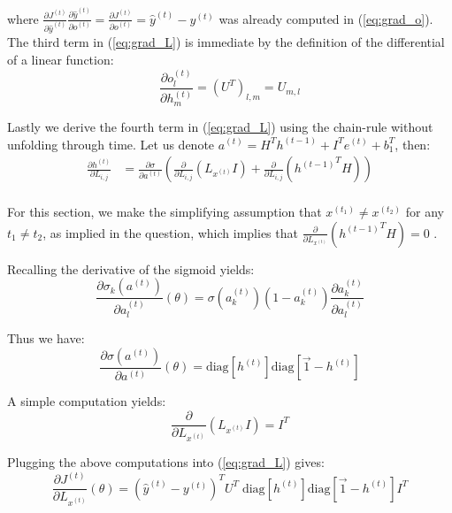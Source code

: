 where $\frac{\partial J^{(t)}}{\partial \hat{y}^{(t)}} \frac{{\partial \hat{y}^{(t)}}}{\partial o^{(t)}} = \frac{\partial J^{(t)}}{\partial o^{(t)}} = \hat{y}^{(t)} - y^{(t)}$ was already computed in (\ref{eq:grad_o}). 
The third term in (\ref{eq:grad_L}) is immediate by the definition of the differential of a linear function:
\begin{equation} \label{eq:grad_o_by_h}
  \frac{\partial o_l^{(t)}}{\partial h_m^{(t)}} = (U^T)_{l,m} = U_{m,l}
\end{equation}

Lastly we derive the fourth term in (\ref{eq:grad_L}) using the chain-rule without unfolding through time.
Let us denote $a^{(t)} = H^T h^{(t-1)} +I^T e^{(t)} + b_1^T$, then:
\begin{equation} \label{eq:grad_h_by_L}
  \begin{aligned}
    \frac{\partial h^{(t)}}{\partial L_{i,j}} &= \frac{\partial \sigma}{\partial a^{(t)}} \left( \frac{\partial}{\partial L_{i,j}} { \left(L_{x^{(t)}}I \right)}  + \frac{\partial }{\partial L_{i,j}} \left( {h^{(t-1)}}^T H \right) \right) \\
  \end{aligned}
\end{equation}

For this section, we make the simplifying assumption that $x^{(t_1)} \neq x^{(t_2)}$ for any $t_1 \neq t_2$, as implied in the question,
which implies that $ \frac{\partial }{\partial L_{x^{(t)}}} \left( {h^{(t-1)}}^T H \right) = 0$ .

Recalling the derivative of the sigmoid yields:
\begin{equation}
  \frac{\partial \sigma_k(a^{(t)})}{\partial a^{(t)}_l}(\theta) = \sigma (a^{(t)}_k) \left(1 - a^{(t)}_k \right) \frac{\partial a^{(t)}_k}{\partial a^{(t)}_l}
\end{equation}

Thus we have:
\begin{equation}
  \frac{\partial \sigma(a^{(t)})}{\partial a^{(t)}}(\theta) = \text{diag}\left[ h^{(t)} \right]  \text{diag}\left[ \vec{1} - h^{(t)} \right] 
\end{equation}

A simple computation yields:
\begin{equation}
  \frac{\partial}{\partial L_{x^{(t)}}} { \left(L_{x^{(t)}}I \right)} = I^T
\end{equation}

Plugging the above computations into (\ref{eq:grad_L}) gives:
\begin{equation} \label{eq:grad_L_final}
  \boxed{ \frac{\partial J^{(t)}}{\partial L_{x^{(t)}}}(\theta) = \left(\hat{y}^{(t)} - y^{(t)}\right)^T U^T \; \text{diag}\left[ h^{(t)} \right] \text{diag}\left[ \vec{1} - h^{(t)} \right] I^T }
\end{equation}


